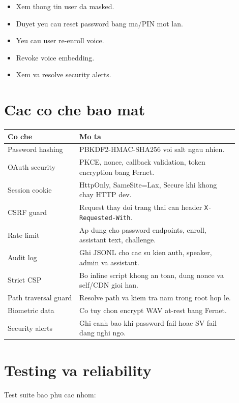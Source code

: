 \documentclass[12pt,a4paper]{article}
\begin{document}
\begin{itemize}
  \item Xem thong tin user da masked.
  \item Duyet yeu cau reset password bang ma/PIN mot lan.
  \item Yeu cau user re-enroll voice.
  \item Revoke voice embedding.
  \item Xem va resolve security alerts.
\end{itemize}

\section{Cac co che bao mat}

\begin{longtable}{p{0.28\linewidth}p{0.62\linewidth}}
\toprule
\textbf{Co che} & \textbf{Mo ta} \\
\midrule
\endhead
Password hashing & PBKDF2-HMAC-SHA256 voi salt ngau nhien. \\
OAuth security & PKCE, nonce, callback validation, token encryption bang Fernet. \\
Session cookie & HttpOnly, SameSite=Lax, Secure khi khong chay HTTP dev. \\
CSRF guard & Request thay doi trang thai can header \texttt{X-Requested-With}. \\
Rate limit & Ap dung cho password endpoints, enroll, assistant text, challenge. \\
Audit log & Ghi JSONL cho cac su kien auth, speaker, admin va assistant. \\
Strict CSP & Bo inline script khong an toan, dung nonce va self/CDN gioi han. \\
Path traversal guard & Resolve path va kiem tra nam trong root hop le. \\
Biometric data & Co tuy chon encrypt WAV at-rest bang Fernet. \\
Security alerts & Ghi canh bao khi password fail hoac SV fail dang nghi ngo. \\
\bottomrule
\end{longtable}

\section{Testing va reliability}

Test suite bao phu cac nhom:
\end{document}
